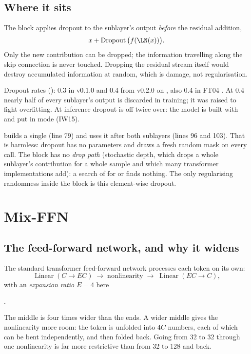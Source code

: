\subsection{Where it sits}

The block applies dropout to the sublayer's output \emph{before} the residual addition,
\[
  x + \operatorname{Dropout}\big(f(\LN(x))\big).
\]
Only the new contribution can be dropped; the information
travelling along the skip connection is never touched. Dropping the residual stream itself would
destroy accumulated information at random, which is damage, not regularisation.

\begin{drift}
Dropout rates (): 0.3 in v0.1.0
 and 0.4 from v0.2.0 on
, also 0.4 in FT04
. At 0.4 nearly half of
every sublayer's output is discarded in training; it was raised to fight overfitting. At inference
dropout is off twice over: the model is built with  and put in
 mode (IW15).
\end{drift}

\begin{sourcenote}
 builds a single  (line 79) and
uses it after both sublayers (lines 96 and 103). That is harmless: dropout has no parameters and
draws a fresh random mask on every call. The block has no \emph{drop path} (stochastic depth, which
drops a whole sublayer's contribution for a whole sample and which many transformer implementations
add): a search of  for  or  finds nothing. The only
regularising randomness inside the block is this element-wise dropout.
\end{sourcenote}

\section{Mix-FFN}\label{sec:block:mixffn}

\subsection{The feed-forward network, and why it widens}

The standard transformer feed-forward network processes each token on
its own:
\[
  \operatorname{Linear}(C \to EC) \;\to\; \text{nonlinearity} \;\to\; \operatorname{Linear}(EC \to C),
\]
with an \emph{expansion ratio} $E = 4$ here
\par\noindent{}.
\par\noindent The middle is four times wider than the ends. A wider middle gives the nonlinearity more room: the token is unfolded
into $4C$ numbers, each of which can be bent independently, and then folded back. Going from 32 to
32 through one nonlinearity is far more restrictive than from 32 to 128 and back.

